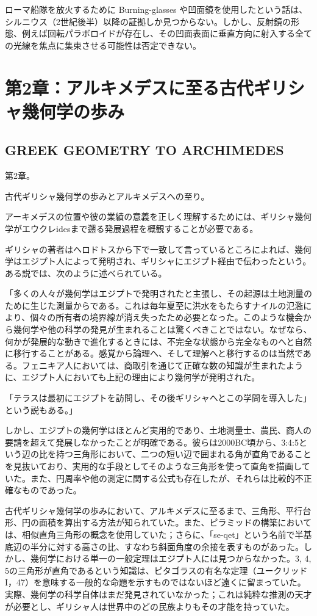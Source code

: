 \documentclass[a4paper,11pt,openany]{ltjsbook}
\begin{document}
ローマ船隊を放火するために Burning-glasses や凹面鏡を使用したという話は、シルニウス（2世紀後半）以降の証拠しか見つからない。しかし、反射鏡の形態、例えば回転パラボロイドが存在し、その凹面表面に垂直方向に射入する全ての光線を焦点に集束させる可能性は否定できない。

\clearpage

\chapter{第2章：アルキメデスに至る古代ギリシャ幾何学の歩み}
\section*{GREEK GEOMETRY TO ARCHIMEDES}

第2章。

古代ギリシャ幾何学の歩みとアルキメデスへの至り。

アーキメデスの位置や彼の業績の意義を正しく理解するためには、ギリシャ幾何学がエウクレidesまで遡る発展過程を概観することが必要である。

ギリシャの著者はヘロドトスから下で一致して言っているところによれば、幾何学はエジプト人によって発明され、ギリシャにエジプト経由で伝わったという。ある説では、次のように述べられている。

「多くの人々が幾何学はエジプトで発明されたと主張し、その起源は土地測量のために生じた測量からである。これは毎年夏至に洪水をもたらすナイルの氾濫により、個々の所有者の境界線が消え失ったため必要となった。このような機会から幾何学や他の科学の発見が生まれることは驚くべきことではない。なぜなら、何かが発展的な動きで進化するときには、不完全な状態から完全なものへと自然に移行することがある。感覚から論理へ、そして理解へと移行するのは当然である。フェニキア人においては、商取引を通じて正確な数の知識が生まれたように、エジプト人においても上記の理由により幾何学が発明された。

「テラスは最初にエジプトを訪問し、その後ギリシャへとこの学問を導入した」という説もある。」

しかし、エジプトの幾何学はほとんど実用的であり、土地測量士、農民、商人の要請を超えて発展しなかったことが明確である。彼らは2000BC頃から、3:4:5という辺の比を持つ三角形において、二つの短い辺で囲まれる角が直角であることを見抜いており、実用的な手段としてそのような三角形を使って直角を描画していた。また、円周率や他の測定に関する公式も存在したが、それらは比較的不正確なものであった。

古代ギリシャ幾何学の歩みにおいて、アルキメデスに至るまで、三角形、平行台形、円の面積を算出する方法が知られていた。また、ピラミッドの構築においては、相似直角三角形の概念を使用していた；さらに、「se-qet」という名前で半基底辺の半分に対する高さの比、すなわち斜面角度の余接を表すものがあった。しかし、幾何学における単一の一般定理はエジプト人には見つからなかった。3, 4, 5の三角形が直角であるという知識は、ピタゴラスの有名な定理（ユークリッドI，47）を意味する一般的な命題を示すものではないほど遠くに留まっていた。実際、幾何学の科学自体はまだ発見されていなかった；これは純粋な推測の天才が必要とし、ギリシャ人は世界中のどの民族よりもその才能を持っていた。
\end{document}
